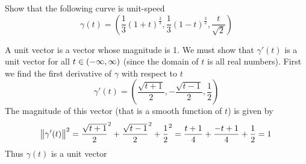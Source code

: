 \begin{problem}
Show that the following curve is unit-speed
\[
    \gamma(t) = (\frac{1}{3} (1 + t)^{\frac{3}{2}}, \frac{1}{3} (1 - t)^{\frac{3}{2}}, \frac{t}{\sqrt{2}})
\]
\end{problem}

\begin{solution}
    A unit vector is a vector whose magnitude is 1. We must show that \(\gamma'(t)\) is a unit vector for all \(t \in \intoo{-\infty, \infty}\) (since the domain of \(t\) is all real numbers). First we find the first derivative of \(\gamma\) with respect to \(t\)
    \[
        \gamma'(t) = (\frac{\sqrt{t + 1}}{2}, -\frac{\sqrt{t - 1}}{2}, \frac{1}{2})
    \]
    The magnitude of this vector (that is a smooth function of \(t\)) is given by
    \[
        \norm{\gamma'(t)}^{2} = \frac{\sqrt{t + 1}}{2}^{2} + \frac{\sqrt{t - 1}}{2}^{2} + \frac{1}{2}^{2} = \frac{t + 1}{4} + \frac{-t + 1}{4} + \frac{1}{2} = 1
    \]
    Thus \(\gamma(t)\) is a unit vector
\end{solution}
